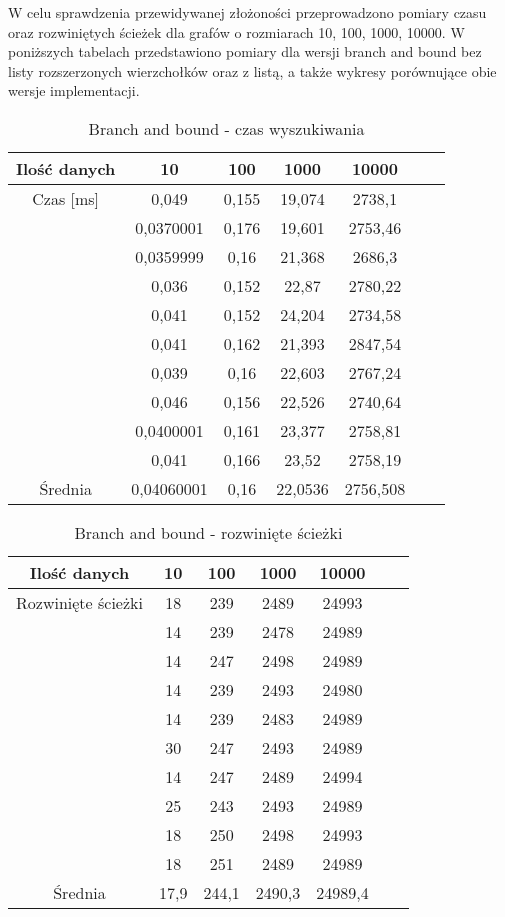 \documentclass[10pt, a4paper]{article}
\begin{document}
\begin{flushleft}
W celu sprawdzenia przewidywanej złożoności przeprowadzono pomiary czasu oraz rozwiniętych ścieżek dla grafów o rozmiarach 10, 100, 1000, 10000. W poniższych tabelach przedstawiono pomiary dla wersji branch and bound bez listy rozszerzonych wierzchołków oraz z listą, a także wykresy porównujące obie wersje implementacji.


\begin{table}[!h]
\centering
\caption{Branch and bound - czas wyszukiwania}
\begin{tabular}{|c|c|c|c|c|c|c|} \hline 
Ilość danych & 10 & 100 & 1000 & 10000 \\ \hline
Czas [ms] & 0,049 & 0,155 & 19,074 & 2738,1 \\
& 0,0370001 & 0,176 & 19,601 & 2753,46 \\
& 0,0359999 & 0,16 & 21,368 & 2686,3 \\
& 0,036 & 0,152 & 22,87 & 2780,22 \\
& 0,041 & 0,152 & 24,204 & 2734,58 \\
& 0,041 & 0,162 & 21,393 & 2847,54 \\
& 0,039 & 0,16 & 22,603 & 2767,24 \\
& 0,046 & 0,156 & 22,526 & 2740,64 \\
& 0,0400001 & 0,161 & 23,377 & 2758,81 \\
& 0,041 & 0,166 & 23,52 & 2758,19  \\ \hline
Średnia & 0,04060001 & 0,16 & 22,0536 & 2756,508 \\ \hline
\end{tabular}
\end{table}

\begin{table}[!h]
\centering
\caption{Branch and bound - rozwinięte ścieżki}
\begin{tabular}{|c|c|c|c|c|c|c|} \hline 
Ilość danych & 10 & 100 & 1000 & 10000 \\ \hline
Rozwinięte ścieżki  & 18 & 239 & 2489 & 24993 \\
& 14 & 239 & 2478 & 24989 \\
& 14 & 247 & 2498 & 24989 \\
& 14 & 239 & 2493 & 24980 \\
& 14 & 239 & 2483 & 24989 \\
& 30 & 247 & 2493 & 24989 \\
& 14 & 247 & 2489 & 24994 \\
& 25 & 243 & 2493 & 24989 \\
& 18 & 250 & 2498 & 24993 \\
& 18 & 251 & 2489 & 24989 \\ \hline
Średnia & 17,9 & 244,1 & 2490,3 & 24989,4 \\ \hline
\end{tabular}
\end{table}


\end{flushleft}
\end{document}
